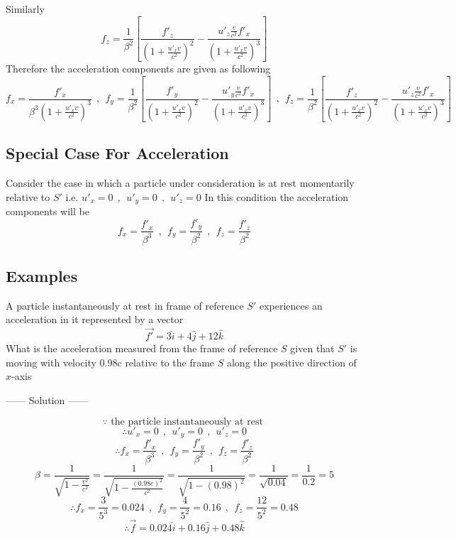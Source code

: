 Similarly
\[
    f_z = \frac{1}{\beta^2} \left[ \frac{f'_z}{{\left(1+\frac{u'_x v }{c^2}\right)}^2} - \frac{u'_z\frac{v}{c^2}f'_x}{{\left(1 + \frac{u'_x v}{c^2}\right)}^3}\right]
\]
Therefore the acceleration components are given as following
\[
f_x = \frac{f'_x}{\beta^3{\left(1 + \frac{u'_x v}{c^2}\right)}^3}
\ \ , \ \ 
f_y =\frac{1}{\beta^2} \left[ \frac{f'_y}{{\left(1+\frac{u'_x v }{c^2}\right)}^2} - \frac{u'_y\frac{v}{c^2}f'_x}{{\left(1 + \frac{u'_x v}{c^2}\right)}^3}\right]
\ \ , \ \ 
f_z = \frac{1}{\beta^2} \left[ \frac{f'_z}{{\left(1+\frac{u'_x v }{c^2}\right)}^2} - \frac{u'_z\frac{v}{c^2}f'_x}{{\left(1 + \frac{u'_x v}{c^2}\right)}^3}\right]
\]
\subsection{Special Case For Acceleration}
Consider the case in which a particle under consideration is at rest momentarily relative to $S'$ i.e. 
$
u'_x =0
\ \ , \ \ 
u'_y =0
\ \ , \ \ 
u'_z =0
$
In this condition the acceleration components will be 
\[
f_x =\frac{f'_x}{\beta^3}
\ \ , \ \ 
f_y =\frac{f'_y}{\beta^2}
\ \ , \ \ 
f_z =\frac{f'_z}{\beta^2}
\]
\subsection{Examples}
\begin{example}
A particle instantaneously at rest in frame of reference $S'$ experiences an acceleration in it represented by a vector 
\[
\vec{f'} = 3 \hat{i} + 4\hat{j} + 12\hat{k}
\]
What is the acceleration measured from the frame of reference $S$ given that $S'$ is moving with velocity 0.98c relative to the frame $S$ along the positive direction of $x$-axis
\begin{center}
    ------ \textcolor{Solution}{Solution} ------
\end{center}
\[
    \because \text{ the particle instantaneously at rest }    
\]
\[
\therefore
u'_x =0
\ \ , \ \ 
u'_y =0
\ \ , \ \ 
u'_z =0
\]
\[
\therefore
f_x =\frac{f'_x}{\beta^3}
\ \ , \ \ 
f_y =\frac{f'_y}{\beta^2}
\ \ , \ \ 
f_z =\frac{f'_z}{\beta^2}
\]
\[
\beta = \frac{1}{\sqrt{1-\frac{v^2}{c^2}}} =  \frac{1}{\sqrt{1-\frac{{(0.98c)}^2}{c^2}}} = \frac{1}{\sqrt{1-{(0.98)}^2}} = \frac{1}{\sqrt{0.04}} = \frac{1}{0.2} = 5
\]
\[
\therefore   
f_x =\frac{3}{5^3} =0.024
\ \ , \ \ 
f_y =\frac{4}{5^2} =0.16
\ \ , \ \ 
f_z =\frac{12}{5^2} = 0.48
\]
\[
\therefore \vec{f} = 0.024 \hat{i} + 0.16 \hat{j} + 0.48\hat{k}
\]
\end{example}

